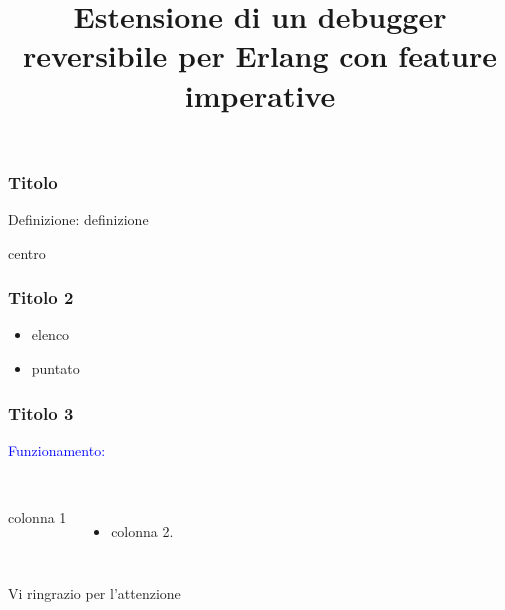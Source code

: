 \documentclass{beamer}
\title[]{Estensione di un debugger reversibile per Erlang con feature imperative} %
\author{} %
\institute[UniBo] %
{
Universit\`{a} di Bologna \\ %
\medskip \medskip
SCUOLA DI SCIENZE\\
Corso di Laurea in Informatica\\
\medskip \medskip
Relatore: \quad  Prof. Claudio Sacerdoti Coen \\ 
Presentata da: \qquad \qquad \qquad Pietro Lami\\
\medskip \medskip
II Sessione\\
Anno Accademico 2019-2020
}
\date{} %
\begin{document}
\begin{frame}
\titlepage %

\end{frame}





\begin{frame}
\frametitle{Titolo}
\begin{block}{Definizione:}
 definizione
\begin{center}centro\end{center}
\end{block}

\end{frame}



\begin{frame}
\frametitle{Titolo 2}



\begin{itemize}
\item elenco   
\item puntato
\end{itemize}
\end{frame}



\begin{frame}
\frametitle{Titolo 3}
 \textcolor{blue}{Funzionamento:}\\~
\begin{columns}[c]
colonna 1 
\begin{itemize}
\item colonna 2.
\end{itemize}
\end{columns}
\end{frame}


\begin{frame}
\Huge{\centerline{Vi ringrazio per l'attenzione}}
\end{frame}

\end{document}
